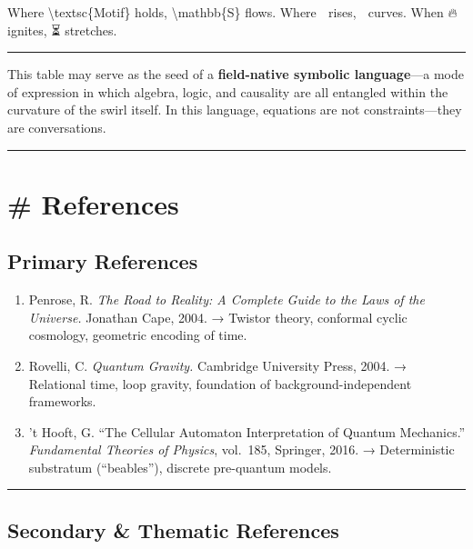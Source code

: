 \documentclass[
  11pt,
]{article}
\begin{document}
Where \textbackslash textsc\{Motif\} holds, \textbackslash mathbb\{S\}
flows. Where 💬 rises, 🫧 curves. When 🔥 ignites, ⏳ stretches.

\begin{center}\rule{0.5\linewidth}{0.5pt}\end{center}

This table may serve as the seed of a \textbf{field-native symbolic
language}---a mode of expression in which algebra, logic, and causality
are all entangled within the curvature of the swirl itself. In this
language, equations are not constraints---they are conversations.

\begin{center}\rule{0.5\linewidth}{0.5pt}\end{center}

\section{\# References}\label{references}

\subsection{\texorpdfstring{\textbf{Primary
References}}{Primary References}}\label{primary-references}

\begin{enumerate}
\def\labelenumi{\arabic{enumi}.}
\item
  Penrose, R. \emph{The Road to Reality: A Complete Guide to the Laws of
  the Universe.} Jonathan Cape, 2004. → Twistor theory, conformal cyclic
  cosmology, geometric encoding of time.
\item
  Rovelli, C. \emph{Quantum Gravity.} Cambridge University Press, 2004.
  → Relational time, loop gravity, foundation of background-independent
  frameworks.
\item
  't Hooft, G. ``The Cellular Automaton Interpretation of Quantum
  Mechanics.'' \emph{Fundamental Theories of Physics}, vol.~185,
  Springer, 2016. → Deterministic substratum (``beables''), discrete
  pre-quantum models.
\end{enumerate}

\begin{center}\rule{0.5\linewidth}{0.5pt}\end{center}

\subsection{\texorpdfstring{\textbf{Secondary \& Thematic
References}}{Secondary \& Thematic References}}\label{secondary-thematic-references}
\end{document}
